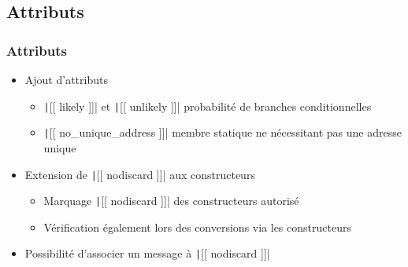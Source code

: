 \documentclass[C++.tex]{subfiles}
\begin{document}
\subsection*{Attributs}
\begin{frame}[fragile]
	\frametitle{Attributs}
	\begin{itemize}
		\item Ajout d'attributs
		\begin{itemize}
			\item \texttt|[[ likely ]]| et \texttt|[[ unlikely ]]| probabilité de branches conditionnelles


			\item \texttt|[[ no_unique_address ]]| membre statique ne nécessitant pas une adresse unique

		\end{itemize}

		\item Extension de \texttt|[[ nodiscard ]]| aux constructeurs
		\begin{itemize}
			\item Marquage \texttt|[[ nodiscard ]]| des constructeurs autorisé
			\item Vérification également lors des conversions via les constructeurs
		\end{itemize}
		\item Possibilité d'associer un message à \texttt|[[ nodiscard ]]|
	\end{itemize}



\end{frame}
\end{document}
